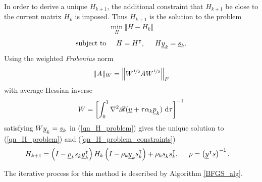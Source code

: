 In order to derive a unique $H_{k+1}$, the additional constraint that $H_{k+1}$ be close to the current matrix $H_k$ is imposed.  Thus $H_{k+1}$ is the solution to the problem
\begin{align}
  \label{qn_H_problem}
  \min_{H} \Vert H - H_k \Vert
\end{align}
\begin{align}
  \label{qn_H_problem_constraints}
  \text{subject to} \hspace{5mm} H = H^\intercal, \hspace{5mm} H \underline{y}_k = \underline{s}_k.
\end{align}
Using the weighted \emph{Frobenius} norm
\begin{align*}
  \Vert A \Vert_W = \left\Vert W^{\nicefrac{1}{2}} A W^{\nicefrac{1}{2}} \right\Vert_F
\end{align*}
with average Hessian inverse
\begin{align*}
  W = \left[ \int_0^1 \nabla^2 \mathscr{R}(\underline{u} + \tau \alpha_k \underline{p}_k ) \ \mathrm{d}\tau \right]^{-1}
\end{align*}
satisfying $W\underline{y}_k = \underline{s}_k$ in (\ref{qn_H_problem}) gives the unique solution to (\ref{qn_H_problem}) and (\ref{qn_H_problem_constraints})
{\footnotesize
\begin{align*}
  H_{k+1} &= \left( I - \underline{\rho}_k \underline{s}_k \underline{y}_k^\intercal \right) H_k \left( I - \rho_k \underline{y}_k \underline{s}_k^\intercal \right) + \rho_k \underline{s}_k \underline{s}_k^\intercal, \hspace{5mm} \rho = \left( \underline{y}^\intercal \underline{s} \right)^{-1}.
\end{align*}}

The iterative process for this method is described by Algorithm \ref{BFGS_alg}.

